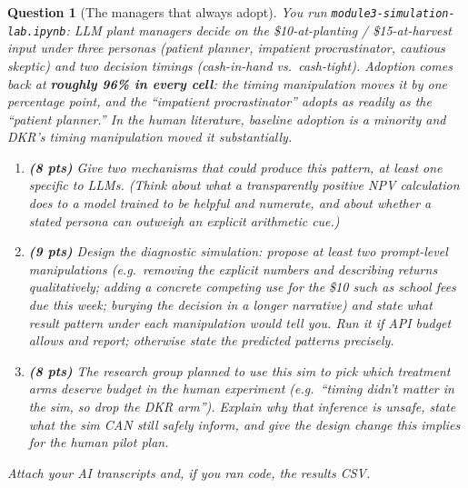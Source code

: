 \documentclass[11pt]{article}
\newtheorem{question}{Question}
\begin{document}
\begin{question}[The managers that always adopt]
You run \texttt{module3-simulation-lab.ipynb}: LLM plant managers decide
on the \$10-at-planting / \$15-at-harvest input under three personas
(patient planner, impatient procrastinator, cautious skeptic) and two
decision timings (cash-in-hand vs.\ cash-tight). Adoption comes back at
\textbf{roughly 96\% in every cell}: the timing manipulation moves it by
one percentage point, and the ``impatient procrastinator'' adopts as readily
as the ``patient planner.'' In the human literature, baseline adoption is
a minority and DKR's timing manipulation moved it substantially.

\begin{enumerate}[label=(\alph*)]
  \item \textbf{(8 pts)} Give two mechanisms that could produce this
        pattern, at least one specific to LLMs. \emph{(Think about what a
        transparently positive NPV calculation does to a model trained to
        be helpful and numerate, and about whether a stated persona can
        outweigh an explicit arithmetic cue.)}
  \item \textbf{(9 pts)} Design the diagnostic simulation: propose at
        least two prompt-level manipulations (e.g.\ removing the explicit
        numbers and describing returns qualitatively; adding a concrete
        competing use for the \$10 such as school fees due this week;
        burying the decision in a longer narrative) and state what result
        pattern under each manipulation would tell you. Run it if API
        budget allows and report; otherwise state the predicted patterns
        precisely.
  \item \textbf{(8 pts)} The research group planned to use this sim to
        pick which treatment arms deserve budget in the human experiment
        (e.g.\ ``timing didn't matter in the sim, so drop the DKR arm'').
        Explain why that inference is unsafe, state what the sim CAN
        still safely inform, and give the design change this implies for
        the human pilot plan.
\end{enumerate}
Attach your AI transcripts and, if you ran code, the results CSV.
\end{question}
\end{document}
